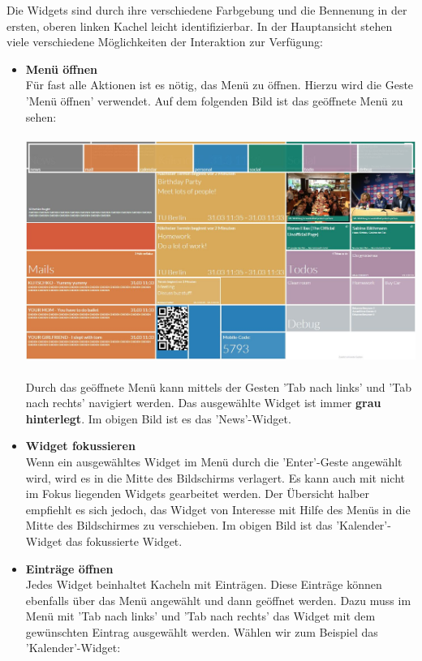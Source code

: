 \documentclass[10pt,a4paper]{report}
\begin{document}
		Die Widgets sind durch ihre verschiedene Farbgebung und die Bennenung in der ersten, oberen linken Kachel leicht identifizierbar. In der Hauptansicht stehen viele verschiedene Möglichkeiten der Interaktion zur Verfügung:
			\begin{itemize}
				\item \textbf{Menü öffnen}\\
				Für fast alle Aktionen ist es nötig, das Menü zu öffnen. Hierzu wird die Geste 'Menü öffnen' verwendet. Auf dem folgenden Bild ist das geöffnete Menü zu sehen:\\\\
				\includegraphics[width=\linewidth]{Menu1}\\\\
				Durch das geöffnete Menü kann mittels der Gesten 'Tab nach links' und 'Tab nach rechts' navigiert werden. Das ausgewählte Widget ist immer \textbf{grau hinterlegt}. Im obigen Bild ist es das 'News'-Widget.
				\item \textbf{Widget fokussieren}\\
				Wenn ein ausgewähltes Widget im Menü durch die 'Enter'-Geste angewählt wird, wird es in die Mitte des Bildschirms verlagert. Es kann auch mit nicht im Fokus liegenden Widgets gearbeitet werden. Der Übersicht halber empfiehlt es sich jedoch, das Widget von Interesse mit Hilfe des Menüs in die Mitte des Bildschirmes zu verschieben. Im obigen Bild ist das 'Kalender'-Widget das fokussierte Widget.
				\item \textbf{Einträge öffnen}\\
				Jedes Widget beinhaltet Kacheln mit Einträgen. Diese Einträge können ebenfalls über das Menü angewählt und dann geöffnet werden. Dazu muss im Menü mit 'Tab nach links' und 'Tab nach rechts' das Widget mit dem gewünschten Eintrag ausgewählt werden. Wählen wir zum Beispiel das 'Kalender'-Widget:\\\\

\end{itemize}
\end{document}
